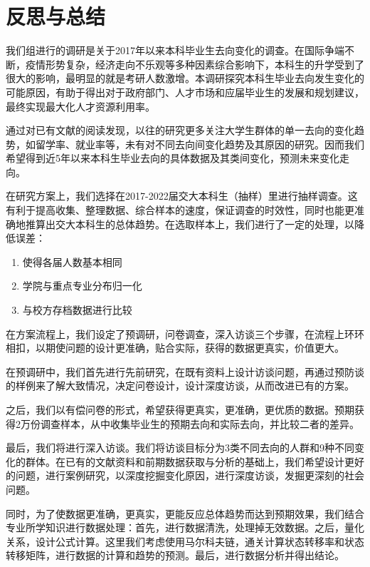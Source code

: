 \documentclass[a4paper]{IEEEtran}
\begin{document}
		\section{反思与总结}
		我们组进行的调研是关于2017年以来本科毕业生去向变化的调查。在国际争端不断，疫情形势复杂，经济走向不乐观等多种因素综合影响下，本科生的升学受到了很大的影响，最明显的就是考研人数激增。本调研探究本科生毕业去向发生变化的可能原因，有助于得出对于政府部门、人才市场和应届毕业生的发展和规划建议，最终实现最大化人才资源利用率。
		
		通过对已有文献的阅读发现，以往的研究更多关注大学生群体的单一去向的变化趋势，如留学率、就业率等，未有对不同去向间变化趋势及其原因的研究。因而我们希望得到近5年以来本科生毕业去向的具体数据及其类间变化，预测未来变化走向。
		
		在研究方案上，我们选择在2017-2022届交大本科生（抽样）里进行抽样调查。这有利于提高收集、整理数据、综合样本的速度，保证调查的时效性，同时也能更准确地推算出交大本科生的总体趋势。在选取样本上，我们进行了一定的处理，以降低误差：
		\begin{enumerate}
			\item 使得各届人数基本相同
			\item 学院与重点专业分布归一化
			\item 与校方存档数据进行比较
		\end{enumerate}
		
		在方案流程上，我们设定了预调研，问卷调查，深入访谈三个步骤，在流程上环环相扣，以期使问题的设计更准确，贴合实际，获得的数据更真实，价值更大。
		
		在预调研中，我们首先进行先前研究，在既有资料上设计访谈问题，再通过预防谈的样例来了解大致情况，决定问卷设计，设计深度访谈，从而改进已有的方案。
		
		之后，我们以有偿问卷的形式，希望获得更真实，更准确，更优质的数据。预期获得2万份调查样本，从中收集毕业生的预期去向和实际去向，并比较二者的差异。
		
		最后，我们将进行深入访谈。我们将访谈目标分为3类不同去向的人群和9种不同变化的群体。在已有的文献资料和前期数据获取与分析的基础上，我们希望设计更好的问题，进行案例研究，以深度挖掘变化原因，进行深度访谈，发掘更深刻的社会问题。
		
		同时，为了使数据更准确，更真实，更能反应总体趋势而达到预期效果，我们结合专业所学知识进行数据处理：首先，进行数据清洗，处理掉无效数据。之后，量化关系，设计公式计算。这里我们考虑使用马尔科夫链，通关计算状态转移率和状态转移矩阵，进行数据的计算和趋势的预测。最后，进行数据分析并得出结论。
		
\end{document}

